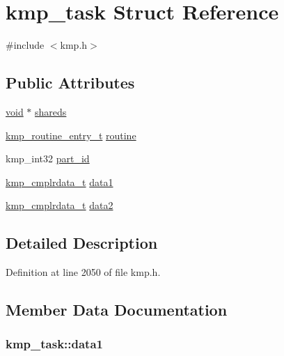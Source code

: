 \hypertarget{structkmp__task}{\section{kmp\-\_\-task Struct Reference}
\label{structkmp__task}
}


{\ttfamily \#include $<$kmp.\-h$>$}

\subsection*{Public Attributes}
\begin{DoxyCompactItemize}
\item 
\hyperlink{ittnotify__static_8h_af941d56e55e3c5465135b60c4d6343ed}{void} $\ast$ \hyperlink{structkmp__task_ad0e726e6cc9b1f0200ef55def8edb2da}{shareds}
\item 
\hyperlink{group__BASIC__TYPES_ga76e21422ff9984d9bafd0b36277ae115}{kmp\-\_\-routine\-\_\-entry\-\_\-t} \hyperlink{structkmp__task_ac00e18629b8e1b48d156efc2a420a129}{routine}
\item 
kmp\-\_\-int32 \hyperlink{structkmp__task_a295f4c11c7a6e1429b923b1943891dd3}{part\-\_\-id}
\item 
\hyperlink{group__BASIC__TYPES_gad4583610db83a88008a785b332fdfd39}{kmp\-\_\-cmplrdata\-\_\-t} \hyperlink{structkmp__task_a5b1637c2a81c11598b53be9e4851a64b}{data1}
\item 
\hyperlink{group__BASIC__TYPES_gad4583610db83a88008a785b332fdfd39}{kmp\-\_\-cmplrdata\-\_\-t} \hyperlink{structkmp__task_a53b9731aa85d94f416024ccdaae48b31}{data2}
\end{DoxyCompactItemize}


\subsection{Detailed Description}


Definition at line 2050 of file kmp.\-h.



\subsection{Member Data Documentation}
\hypertarget{structkmp__task_a5b1637c2a81c11598b53be9e4851a64b}{
\subsubsection[{data1}]{ kmp\-\_\-task\-::data1}}\label{structkmp__task_a5b1637c2a81c11598b53be9e4851a64b}


